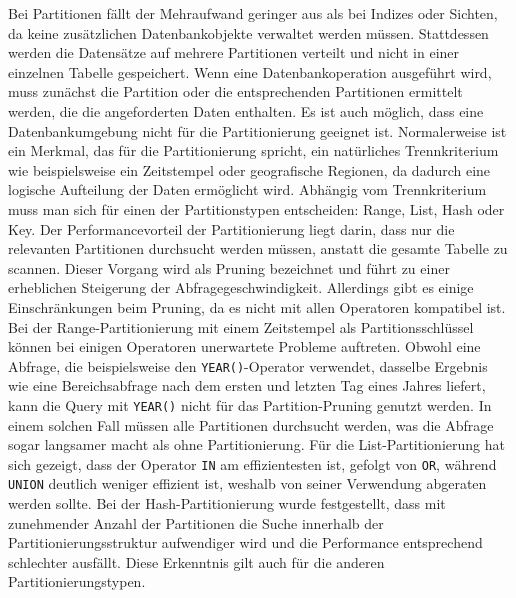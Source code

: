 Bei Partitionen fällt der Mehraufwand geringer aus als bei Indizes oder Sichten, da keine zusätzlichen Datenbankobjekte verwaltet werden müssen.
Stattdessen werden die Datensätze auf mehrere Partitionen verteilt und nicht in einer einzelnen Tabelle gespeichert.
Wenn eine Datenbankoperation ausgeführt wird, muss zunächst die Partition oder die entsprechenden Partitionen ermittelt werden, die die angeforderten Daten enthalten.
Es ist auch möglich, dass eine Datenbankumgebung nicht für die Partitionierung geeignet ist.
Normalerweise ist ein Merkmal, das für die Partitionierung spricht, ein natürliches Trennkriterium wie beispielsweise ein Zeitstempel oder geografische Regionen, da dadurch eine logische Aufteilung der Daten ermöglicht wird.
Abhängig vom Trennkriterium muss man sich für einen der Partitionstypen entscheiden: Range, List, Hash oder Key.
Der Performancevorteil der Partitionierung liegt darin, dass nur die relevanten Partitionen durchsucht werden müssen, anstatt die gesamte Tabelle zu scannen.
Dieser Vorgang wird als Pruning bezeichnet und führt zu einer erheblichen Steigerung der Abfragegeschwindigkeit.
Allerdings gibt es einige Einschränkungen beim Pruning, da es nicht mit allen Operatoren kompatibel ist.
Bei der Range-Partitionierung mit einem Zeitstempel als Partitionsschlüssel können bei einigen Operatoren unerwartete Probleme auftreten.
Obwohl eine Abfrage, die beispielsweise den \texttt{YEAR()}-Operator verwendet, dasselbe Ergebnis wie eine Bereichsabfrage nach dem ersten und letzten Tag eines Jahres liefert, kann die Query mit \texttt{YEAR()} nicht für das Partition-Pruning genutzt werden.
In einem solchen Fall müssen alle Partitionen durchsucht werden, was die Abfrage sogar langsamer macht als ohne Partitionierung.
Für die List-Partitionierung hat sich gezeigt, dass der Operator \texttt{IN} am effizientesten ist, gefolgt von \texttt{OR}, während \texttt{UNION} deutlich weniger effizient ist, weshalb von seiner Verwendung abgeraten werden sollte.
Bei der Hash-Partitionierung wurde festgestellt, dass mit zunehmender Anzahl der Partitionen die Suche innerhalb der Partitionierungsstruktur aufwendiger wird und die Performance entsprechend schlechter ausfällt.
Diese Erkenntnis gilt auch für die anderen Partitionierungstypen.

